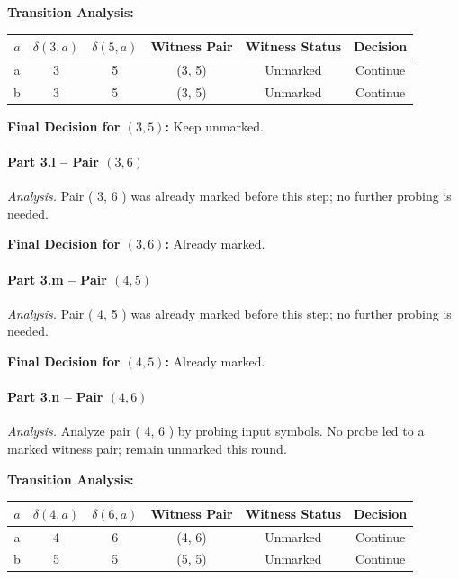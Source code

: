 \documentclass{article}
\begin{document}
\noindent\textbf{Transition Analysis:}
\begin{center}
\begin{tabular}{c c c c c c}
\hline
$a$ & $\delta(3,a)$ & $\delta(5,a)$ & Witness Pair & Witness Status & Decision \\
\hline
a & 3 & 5 &
(3, 5) &
Unmarked &
Continue \\
b & 3 & 5 &
(3, 5) &
Unmarked &
Continue \\
\hline
\end{tabular}
\end{center}



\noindent\textbf{Final Decision for $( 3, 5 )$:} Keep unmarked.

\vspace{0.75em}
\paragraph{Part 3.l \;–\; Pair $( 3, 6 )$}

\emph{Analysis.} Pair ( 3, 6 ) was already marked before this step; no further probing is needed.

\noindent\textbf{Final Decision for $( 3, 6 )$:} Already marked.

\vspace{0.75em}
\paragraph{Part 3.m \;–\; Pair $( 4, 5 )$}

\emph{Analysis.} Pair ( 4, 5 ) was already marked before this step; no further probing is needed.

\noindent\textbf{Final Decision for $( 4, 5 )$:} Already marked.

\vspace{0.75em}
\paragraph{Part 3.n \;–\; Pair $( 4, 6 )$}

\emph{Analysis.} Analyze pair ( 4, 6 ) by probing input symbols. No probe led to a marked witness pair; remain unmarked this round.

\noindent\textbf{Transition Analysis:}
\begin{center}
\begin{tabular}{c c c c c c}
\hline
$a$ & $\delta(4,a)$ & $\delta(6,a)$ & Witness Pair & Witness Status & Decision \\
\hline
a & 4 & 6 &
(4, 6) &
Unmarked &
Continue \\
b & 5 & 5 &
(5, 5) &
Unmarked &
Continue \\
\hline
\end{tabular}
\end{center}
\end{document}
